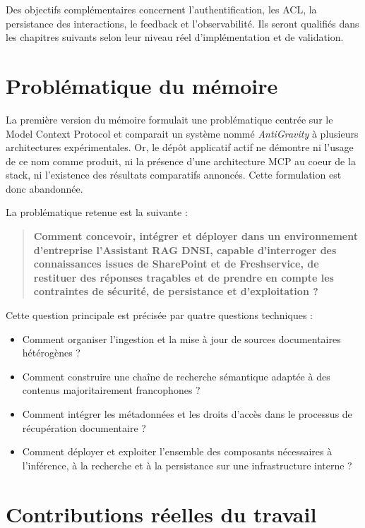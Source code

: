 Des objectifs complémentaires concernent l'authentification, les ACL, la persistance des interactions, le feedback et l'observabilité. Ils seront qualifiés dans les chapitres suivants selon leur niveau réel d'implémentation et de validation.

\section{Problématique du mémoire}

La première version du mémoire formulait une problématique centrée sur le Model Context Protocol et comparait un système nommé \textit{AntiGravity} à plusieurs architectures expérimentales. Or, le dépôt applicatif actif ne démontre ni l'usage de ce nom comme produit, ni la présence d'une architecture MCP au coeur de la stack, ni l'existence des résultats comparatifs annoncés. Cette formulation est donc abandonnée.

La problématique retenue est la suivante :

\begin{quote}
\textbf{Comment concevoir, intégrer et déployer dans un environnement d'entreprise l'Assistant RAG DNSI, capable d'interroger des connaissances issues de SharePoint et de Freshservice, de restituer des réponses traçables et de prendre en compte les contraintes de sécurité, de persistance et d'exploitation ?}
\end{quote}

Cette question principale est précisée par quatre questions techniques :

\begin{itemize}
    \item Comment organiser l'ingestion et la mise à jour de sources documentaires hétérogènes ?
    \item Comment construire une chaîne de recherche sémantique adaptée à des contenus majoritairement francophones ?
    \item Comment intégrer les métadonnées et les droits d'accès dans le processus de récupération documentaire ?
    \item Comment déployer et exploiter l'ensemble des composants nécessaires à l'inférence, à la recherche et à la persistance sur une infrastructure interne ?
\end{itemize}

\section{Contributions réelles du travail}

